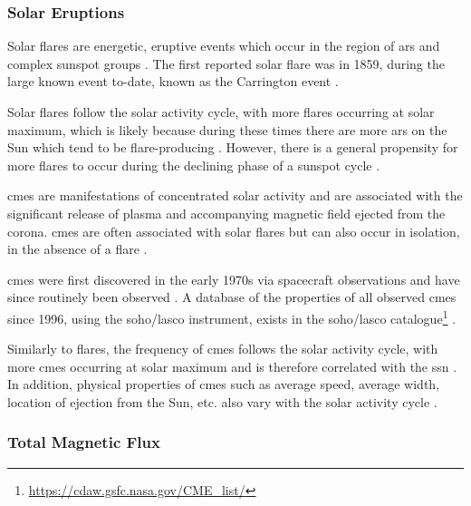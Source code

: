 \subsubsection*{Solar Eruptions}
Solar flares are energetic, eruptive events which occur in the region of \glspl{ar} and complex sunspot groups \citep{hathaway_solar_2015}. The first reported solar flare was in 1859, during the large known event to-date, known as the Carrington event \citep{carrington_description_1859}.

Solar flares follow the solar activity cycle, with more flares occurring at solar maximum, which is likely because during these times there are more \glspl{ar} on the Sun which tend to be flare-producing \citep{gopalswamy_corona_2010, hathaway_solar_2015}. However, there is a general propensity for more flares to occur during the declining phase of a sunspot cycle \citep{hathaway_solar_2015}.

\glspl{cme} are manifestations of concentrated solar activity and are associated with the significant release of plasma and accompanying magnetic field ejected from the corona. \glspl{cme} are often associated with solar flares but can also occur in isolation, in the absence of a flare \citep{hathaway_solar_2015}.

\glspl{cme} were first discovered in the early 1970s via spacecraft observations and have since routinely been observed \citep{hathaway_solar_2015}. A database of the properties of all observed \glspl{cme} since 1996, using the \gls{soho/lasco} instrument, exists in the \gls{soho/lasco} catalogue\footnote{\url{https://cdaw.gsfc.nasa.gov/CME_list/}} \citep{yashiro_catalog_2004, gopalswamy_soholasco_2009}. 

Similarly to flares, the frequency of \glspl{cme} follows the solar activity cycle, with more \glspl{cme} occurring at solar maximum \citep{gopalswamy_corona_2010} and is therefore correlated with the \gls{ssn} \citep{webb_solar_1994}. In addition, physical properties of \glspl{cme} such as average speed, average width, location of ejection from the Sun, etc. also vary with the solar activity cycle \citep{yashiro_catalog_2004}.


\subsubsection*{Total Magnetic Flux}


